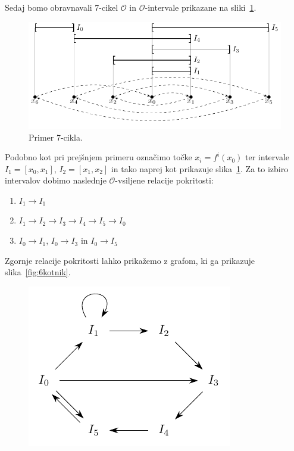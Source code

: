 \documentclass[mat2]{fmfdelo}
\begin{document}
\begin{primer}[7-cikel] \label{primer2}
Sedaj bomo obravnavali 7-cikel $\mathcal{O}$ in $\mathcal{O}$-intervale prikazane na sliki~\ref{fig:7cikel}.
\begin{figure}[h]
  \centering
  \includegraphics{images/sedemcikel.pdf}
  \caption[Primer vektorske slike.]{Primer 7-cikla.}
  \label{fig:7cikel}
\end{figure}
 Podobno kot pri prejšnjem primeru označimo točke $x_i = f^i(x_0)$ ter intervale $I_1 = [x_0, x_1]$, $I_2 = [x_1, x_2]$  in tako naprej kot prikazuje slika~\ref{fig:7cikel}. Za to izbiro intervalov dobimo naslednje $\mathcal{O}$-vsiljene relacije pokritosti:
\begin{enumerate}
\item $I_1 \to I_1$
\item $I_1 \to I_2 \to I_3 \to I_4 \to I_5 \to I_0$
\item $I_0 \to I_1$, $I_0 \to I_3$ in $I_0 \to I_5$
\end{enumerate}
Zgornje relacije pokritosti lahko prikažemo z grafom, ki ga prikazuje slika~\ref{fig:6kotnik}.
\begin{figure}[h]
  \centering
  \includegraphics{images/graph6.pdf}

\end{figure}
\end{primer}
\end{document}
